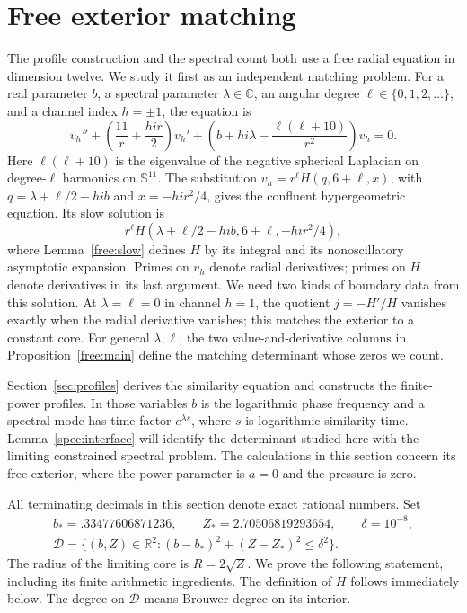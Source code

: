\section{Free exterior matching}\label{sec:free}

The profile construction and the spectral count both use a free radial
equation in dimension twelve. We study it first as an independent matching
problem. For a real parameter $b$, a spectral parameter $\lambda\in\mathbb C$,
an angular degree $\ell\in\{0,1,2,\ldots\}$, and a channel index $h=\pm1$,
the equation is
\begin{equation}\label{free:radial-equation}
 v_h''+\left(\frac{11}{r}+\frac{hi r}{2}\right)v_h'
 +\left(b+hi\lambda-\frac{\ell(\ell+10)}{r^2}\right)v_h=0.
\end{equation}
Here $\ell(\ell+10)$ is the eigenvalue of the negative spherical Laplacian
on degree-$\ell$ harmonics on $\mathbb S^{11}$. The substitution
$v_h=r^\ell H(q,6+\ell,x)$, with
$q=\lambda+\ell/2-hib$ and $x=-hi r^2/4$, gives the confluent
hypergeometric equation. Its slow solution is
\[
 r^\ell H(\lambda+\ell/2-hi b,6+\ell,-hi r^2/4),
\]
where Lemma~\ref{free:slow} defines $H$ by its integral and its
nonoscillatory asymptotic expansion. Primes on $v_h$ denote radial
derivatives; primes on $H$ denote derivatives in its last argument.
We need two kinds of boundary data
from this solution. At $\lambda=\ell=0$ in channel $h=1$, the quotient
$j=-H'/H$ vanishes exactly when the radial derivative vanishes; this
matches the exterior to a constant core. For general $\lambda,\ell$,
the two value-and-derivative columns in Proposition~\ref{free:main}
define the matching determinant whose zeros we count.

Section~\ref{sec:profiles} derives the similarity equation and constructs
the finite-power profiles. In those variables $b$ is the logarithmic phase
frequency and a spectral mode has time factor $e^{\lambda s}$, where
$s$ is logarithmic similarity time.
Lemma~\ref{spec:interface} will identify the determinant studied here
with the limiting constrained spectral problem. The calculations in this
section concern its free exterior, where the power parameter is $a=0$
and the pressure is zero.

All terminating decimals in this section denote exact rational numbers.  Set
\begin{equation}\label{free:disk}
 \begin{gathered}
 b_*=.33477606871236,\qquad Z_*=2.70506819293654,\qquad
 \delta=10^{-8},\\
 \mathcal D=\{(b,Z)\in\mathbb R^2:(b-b_*)^2+(Z-Z_*)^2\le\delta^2\}.
 \end{gathered}
\end{equation}
The radius of the limiting core is $R=2\sqrt Z$.
We prove the following statement, including its finite
arithmetic ingredients.  The definition of $H$ follows immediately below.
The degree on $\mathcal D$ means Brouwer degree on its interior.

